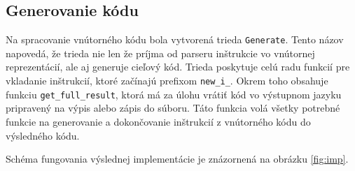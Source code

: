 \subsection{Generovanie kódu}
Na spracovanie vnútorného kódu bola vytvorená trieda \texttt{Generate}. Tento názov napovedá, že trieda nie len že príjma od parseru inštrukcie vo vnútornej reprezentácií, ale aj generuje cieľový kód. Trieda poskytuje celú radu funkcií pre vkladanie inštrukcií, ktoré začínajú prefixom \texttt{new\_i\_}. Okrem toho obsahuje funkciu \texttt{get\_full\_result}, ktorá má za úlohu vrátiť kód vo výstupnom jazyku pripravený na výpis alebo zápis do súboru. Táto funkcia volá všetky potrebné funkcie na generovanie a dokončovanie inštrukcií z vnútorného kódu do výsledného kódu.

Schéma fungovania výslednej implementácie je znázornená na obrázku \ref{fig:imp}.

